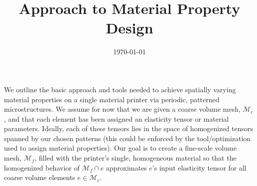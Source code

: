 \documentclass[10pt]{article}
\title{Approach to Material Property Design}
\author{}
\date{\vspace{-24pt} \today}
\providecommand{\mesh}{\mathcal{M}}
\begin{document}
\maketitle
We outline the basic approach and tools needed to achieve spatially varying
material properties on a single material printer via periodic, patterned
microstructures. We assume for now that we are given a coarse volume mesh,
$\mesh_c$, and that each element has been assigned an elasticity tensor or
material parameters. Ideally, each of these tensors lies in the space of
homogenized tensors spanned by our chosen patterns (this could be enforced by
the tool/optimization used to assign material properties). Our goal is to create
a fine-scale volume mesh, $\mesh_f$, filled with the printer's single,
homogeneous material so that the homogenized behavior of $\mesh_f \cap e$
approximates $e$'s input elasticity tensor for all coarse volume elements $e \in
\mesh_c$.
\end{document}
